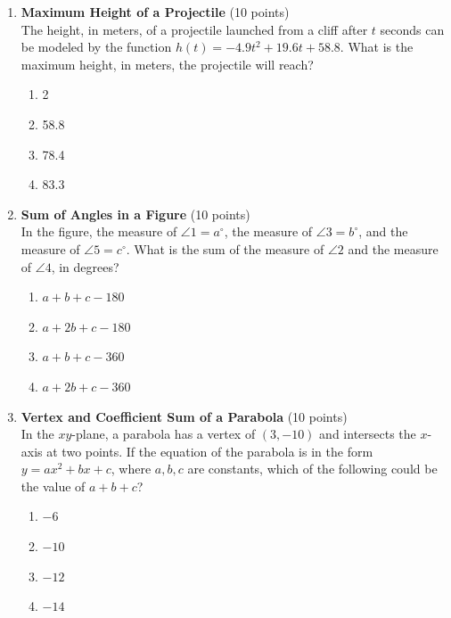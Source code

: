 \begin{enumerate}
  

  \item \textbf{Maximum Height of a Projectile} (10 points)\\
  The height, in meters, of a projectile launched from a cliff after $t$ seconds can be modeled by the function $h(t) = -4.9 t^2 + 19.6 t + 58.8$. What is the maximum height, in meters, the projectile will reach?
  \begin{enumerate}[label=(\Alph*)]
    \item 2
    \item 58.8
    \item 78.4
    \item 83.3
  \end{enumerate}
  \begin{subanswer}
  \end{subanswer}


  \newpage

  

  \item \textbf{Sum of Angles in a Figure} (10 points)\\
  In the figure, the measure of $\angle 1 = a^\circ$, the measure of $\angle 3 = b^\circ$, and the measure of $\angle 5 = c^\circ$. What is the sum of the measure of $\angle 2$ and the measure of $\angle 4$, in degrees?
  \begin{enumerate}[label=(\Alph*)]
    \item $a + b + c - 180$
    \item $a + 2b + c - 180$
    \item $a + b + c - 360$
    \item $a + 2b + c - 360$
  \end{enumerate}
  \begin{subanswer}
  \end{subanswer}

  

  \item \textbf{Vertex and Coefficient Sum of a Parabola} (10 points)\\
  In the $xy$-plane, a parabola has a vertex of $(3, -10)$ and intersects the $x$-axis at two points. If the equation of the parabola is in the form $y = a x^2 + b x + c$, where $a, b, c$ are constants, which of the following could be the value of $a + b + c$?
  \begin{enumerate}[label=(\Alph*)]
    \item $-6$
    \item $-10$
    \item $-12$
    \item $-14$
  \end{enumerate}
  \begin{subanswer}
  \end{subanswer}




\end{enumerate}
